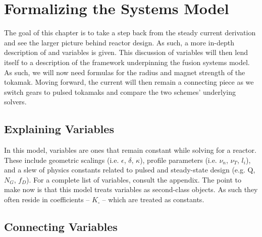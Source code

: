 %
%
%
%
%
%
%
%

\chapter{Formalizing the Systems Model}

The goal of this chapter is to take a step back from the steady current derivation and see the larger picture behind reactor design. As such, a more in-depth description of  and  variables is given. This discussion of  variables will then lend itself to a description of the framework underpinning the fusion systems model. As such, we will now need formulas for the radius and magnet strength of the tokamak. Moving forward, the current will then remain a connecting piece as we switch gears to pulsed tokamaks and compare the two schemes' underlying solvers.

\section{Explaining  Variables} 

In this model,  variables are ones that remain constant while solving for a reactor. These include geometric scalings (i.e. $\epsilon$, $\delta$, $\kappa$), profile parameters (i.e. $\nu_n$, $\nu_T$, $l_i$), and a slew of physics constants related to pulsed and steady-state design (e.g. Q, $N_G$, $f_D$). For a complete list of  variables, consult the appendix. The point to make now is that this model treats  variables as second-class objects. As such they often reside in  coefficients -- $K_\square$ -- which are treated as constants.

\section{Connecting  Variables}

